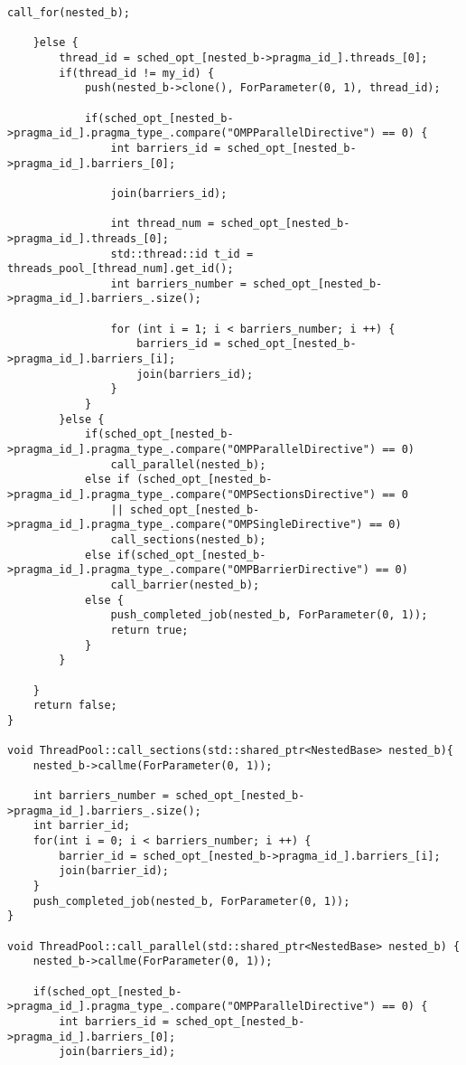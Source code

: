 \documentclass[a4paper,10pt,twoside]{book}
\begin{document}
\begin{lstlisting}[language=CCC, caption=thread\_pool.cpp]
        call_for(nested_b);

    }else {
        thread_id = sched_opt_[nested_b->pragma_id_].threads_[0];
        if(thread_id != my_id) {
            push(nested_b->clone(), ForParameter(0, 1), thread_id);
            
            if(sched_opt_[nested_b->pragma_id_].pragma_type_.compare("OMPParallelDirective") == 0) {
                int barriers_id = sched_opt_[nested_b->pragma_id_].barriers_[0];

                join(barriers_id);
                
                int thread_num = sched_opt_[nested_b->pragma_id_].threads_[0];
                std::thread::id t_id = threads_pool_[thread_num].get_id();
                int barriers_number = sched_opt_[nested_b->pragma_id_].barriers_.size();
                
                for (int i = 1; i < barriers_number; i ++) {
                    barriers_id = sched_opt_[nested_b->pragma_id_].barriers_[i];
                    join(barriers_id);
                }
            }
        }else {
            if(sched_opt_[nested_b->pragma_id_].pragma_type_.compare("OMPParallelDirective") == 0)
                call_parallel(nested_b);
            else if (sched_opt_[nested_b->pragma_id_].pragma_type_.compare("OMPSectionsDirective") == 0
                || sched_opt_[nested_b->pragma_id_].pragma_type_.compare("OMPSingleDirective") == 0)
                call_sections(nested_b);
            else if(sched_opt_[nested_b->pragma_id_].pragma_type_.compare("OMPBarrierDirective") == 0)
                call_barrier(nested_b);
            else {
                push_completed_job(nested_b, ForParameter(0, 1));
                return true;
            }
        }

    }
    return false;
}

void ThreadPool::call_sections(std::shared_ptr<NestedBase> nested_b){
    nested_b->callme(ForParameter(0, 1));
    
    int barriers_number = sched_opt_[nested_b->pragma_id_].barriers_.size();
    int barrier_id;
    for(int i = 0; i < barriers_number; i ++) {
        barrier_id = sched_opt_[nested_b->pragma_id_].barriers_[i];
        join(barrier_id);
    }
    push_completed_job(nested_b, ForParameter(0, 1));
}

void ThreadPool::call_parallel(std::shared_ptr<NestedBase> nested_b) {
    nested_b->callme(ForParameter(0, 1));

    if(sched_opt_[nested_b->pragma_id_].pragma_type_.compare("OMPParallelDirective") == 0) {
        int barriers_id = sched_opt_[nested_b->pragma_id_].barriers_[0];
        join(barriers_id);
            

\end{lstlisting}
\end{document}
